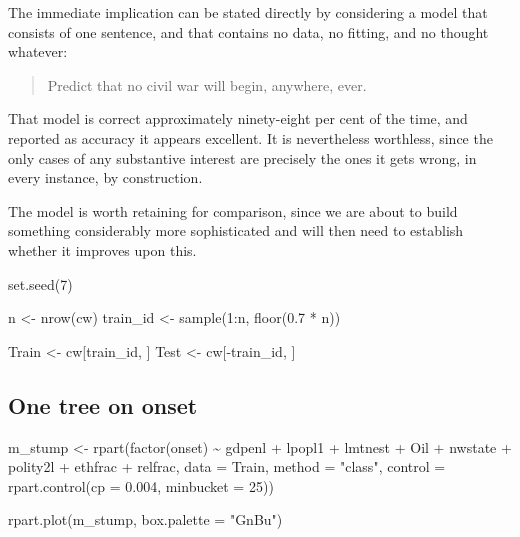 \documentclass[
  a4paper,
]{scrbook}
\newenvironment{Shaded}{\begin{snugshade}}{\end{snugshade}}
\newcommand{\AttributeTok}[1]{\textcolor[rgb]{0.40,0.45,0.13}{#1}}
\newcommand{\DecValTok}[1]{\textcolor[rgb]{0.68,0.00,0.00}{#1}}
\newcommand{\FloatTok}[1]{\textcolor[rgb]{0.68,0.00,0.00}{#1}}
\newcommand{\FunctionTok}[1]{\textcolor[rgb]{0.28,0.35,0.67}{#1}}
\newcommand{\NormalTok}[1]{\textcolor[rgb]{0.00,0.23,0.31}{#1}}
\newcommand{\OtherTok}[1]{\textcolor[rgb]{0.00,0.23,0.31}{#1}}
\newcommand{\SpecialCharTok}[1]{\textcolor[rgb]{0.37,0.37,0.37}{#1}}
\newcommand{\StringTok}[1]{\textcolor[rgb]{0.13,0.47,0.30}{#1}}
\begin{document}
The immediate implication can be stated directly by considering a model
that consists of one sentence, and that contains no data, no fitting,
and no thought whatever:

\begin{quote}
Predict that no civil war will begin, anywhere, ever.
\end{quote}

That model is correct approximately ninety-eight per cent of the time,
and reported as accuracy it appears excellent. It is nevertheless
worthless, since the only cases of any substantive interest are
precisely the ones it gets wrong, in every instance, by construction.

The model is worth retaining for comparison, since we are about to build
something considerably more sophisticated and will then need to
establish whether it improves upon this.

\begin{Shaded}
\begin{Highlighting}[]
\FunctionTok{set.seed}\NormalTok{(}\DecValTok{7}\NormalTok{)}

\NormalTok{n        }\OtherTok{\textless{}{-}} \FunctionTok{nrow}\NormalTok{(cw)}
\NormalTok{train\_id }\OtherTok{\textless{}{-}} \FunctionTok{sample}\NormalTok{(}\DecValTok{1}\SpecialCharTok{:}\NormalTok{n, }\FunctionTok{floor}\NormalTok{(}\FloatTok{0.7} \SpecialCharTok{*}\NormalTok{ n))}

\NormalTok{Train }\OtherTok{\textless{}{-}}\NormalTok{ cw[train\_id, ]}
\NormalTok{Test  }\OtherTok{\textless{}{-}}\NormalTok{ cw[}\SpecialCharTok{{-}}\NormalTok{train\_id, ]}
\end{Highlighting}
\end{Shaded}

\subsection{One tree on onset}\label{one-tree-on-onset}

\begin{Shaded}
\begin{Highlighting}[]
\NormalTok{m\_stump }\OtherTok{\textless{}{-}} \FunctionTok{rpart}\NormalTok{(}\FunctionTok{factor}\NormalTok{(onset) }\SpecialCharTok{\textasciitilde{}}\NormalTok{ gdpenl }\SpecialCharTok{+}\NormalTok{ lpopl1 }\SpecialCharTok{+}\NormalTok{ lmtnest }\SpecialCharTok{+}\NormalTok{ Oil }\SpecialCharTok{+}
\NormalTok{                   nwstate }\SpecialCharTok{+}\NormalTok{ polity2l }\SpecialCharTok{+}\NormalTok{ ethfrac }\SpecialCharTok{+}\NormalTok{ relfrac,}
                 \AttributeTok{data =}\NormalTok{ Train, }\AttributeTok{method =} \StringTok{"class"}\NormalTok{,}
                 \AttributeTok{control =} \FunctionTok{rpart.control}\NormalTok{(}\AttributeTok{cp =} \FloatTok{0.004}\NormalTok{, }\AttributeTok{minbucket =} \DecValTok{25}\NormalTok{))}

\FunctionTok{rpart.plot}\NormalTok{(m\_stump, }\AttributeTok{box.palette =} \StringTok{"GnBu"}\NormalTok{)}
\end{Highlighting}
\end{Shaded}
\end{document}
